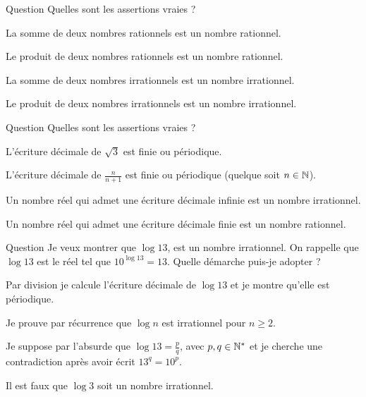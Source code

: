 \begin{multi}[multiple,feedback=
{La somme de deux nombres rationnels est un nombre rationnel. Le produit aussi.
C'est en général faux pour les nombres irrationnels !
}]{Question}
Quelles sont les assertions vraies ?

    \item* La somme de deux nombres rationnels est un nombre rationnel.
    \item* Le produit de deux nombres rationnels est un nombre rationnel.
    \item La somme de deux nombres irrationnels est un nombre irrationnel.
    \item Le produit de deux nombres irrationnels est un nombre irrationnel.
\end{multi}


\begin{multi}[multiple,feedback=
{Les nombre rationnels sont exactement les nombres qui admettent une écriture décimale finie ou périodique.
}]{Question}
Quelles sont les assertions vraies ?

    \item L'écriture décimale de \(\sqrt{3}\) est finie ou périodique.
    \item* L'écriture décimale de \(\frac{n}{n+1}\) est finie ou périodique (quelque soit \(n\in\mathbb{N}\)).
    \item Un nombre réel qui admet une écriture décimale infinie est un nombre irrationnel.
    \item* Un nombre réel qui admet une écriture décimale finie est un nombre rationnel.
\end{multi}


\begin{multi}[multiple,feedback=
{On raisonne par l'absurde en écrivant \(\log 13 = \frac pq\), où \(p,q\) sont des entiers strictement positifs. On en déduit que \(13^q = 10^p\). Comme \(13\) et \(10\) sont premiers entre eux, alors on obtient \(p=q=0\) et donc une contradiction.
}]{Question}
Je veux montrer que \(\log 13\), est un nombre irrationnel. On rappelle que \(\log 13\) est le réel tel que \(10^{\log 13} = 13\). Quelle démarche puis-je adopter ?

    \item Par division je calcule l'écriture décimale de \(\log 13\) et je montre qu'elle est périodique.
    \item Je prouve par récurrence que \(\log n\) est irrationnel pour \(n\ge2\).
    \item* Je suppose par l'absurde que \(\log 13 = \frac pq\), avec \(p,q \in \mathbb{N}^*\) et je cherche une contradiction après avoir écrit \(13^q = 10^p\).
    \item Il est faux que \(\log 3\) soit un nombre irrationnel.
\end{multi}



